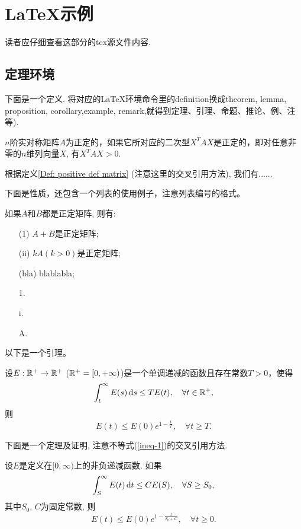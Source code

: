 \section{\LaTeX 示例}

读者应仔细查看这部分的tex源文件内容.

\subsection{定理环境}

下面是一个定义. 将对应的\LaTeX{}环境命令里的definition换成theorem, lemma, proposition, corollary,example, remark,就得到定理、引理、命题、推论、例、注等).
\begin{definition}\label{Def: positive def matrix}
$n$阶实对称矩阵$A$为正定的，如果它所对应的二次型$X^T A X$是正定的，即对任意非零的$n$维列向量$X$, 有$X^T A X>0$.
\end{definition}



根据定义\ref{Def: positive def matrix} (注意这里的交叉引用方法), 我们有......

下面是性质，还包含一个列表的使用例子，注意列表编号的格式。
\begin{property}\label{Property: positive matrix}
如果$A$和$B$都是正定矩阵, 则有:
\begin{itemize}
  \item[(1)]$A+B$是正定矩阵;
  \item[(ii)]$kA$$(k>0)$是正定矩阵;
  \item[(bla)]blablabla;
  \item[1.]
  \item[i.]
  \item[A.]
\end{itemize}
\end{property}

以下是一个引理。
\begin{lemma}
设$E:\Bbb{R}^+ \to \Bbb{R}^+$ ($\Bbb{R}^+=[0,+\infty)$)是一个单调递减的函数且存在常数$T>0$，使得
$$\int_t^{\infty} E(s) \mathop{}\!\mathrm{d} s \leq TE(t),\quad \forall t\in \Bbb{R}^+,$$
则
$$E(t)\leq E(0) e^{1- \frac{t}{T}},\quad \forall t\geq T. $$
\end{lemma}

下面是一个定理及证明, 注意不等式(\ref{ineq-1})的交叉引用方法.
\begin{theorem}
设$E$是定义在$[0,\infty)$上的非负递减函数. 如果
\begin{equation}\label{ineq-1}  %
\int_S^{\infty} E(t) \d t \leq CE(S),\quad \forall S\geq S_0,
\end{equation}
其中$S_0$, $C$为固定常数, 则
$$E(t)\leq E(0)e^{1-\frac{t}{S_0+C}},\quad \forall t\geq 0.$$
\end{theorem}

